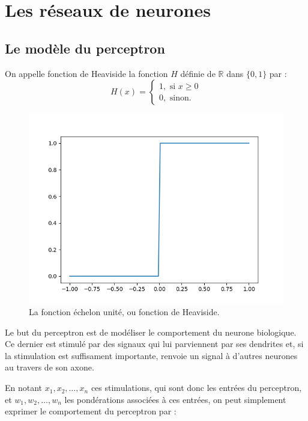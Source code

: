 
\chapter{Les réseaux de neurones}




\section{Le modèle du perceptron}



\begin{definition}
On appelle fonction de Heaviside la fonction $H$ définie de $\mathbb{R}$ dans $\{0, 1\}$ par :
\[
H(x) = 
\begin{cases}
 1, \text{ si } x \geq 0 \\
 0, \text{ sinon.} 
 \end{cases}
\]
\end{definition}

\begin{figure}[h]
  \centering
  \includegraphics[scale=0.5]{assets/heaviside}
  \caption{La fonction échelon unité, ou fonction de Heaviside.}
  \label{fig:heaviside}
\end{figure}

Le but du perceptron est de modéliser le comportement du neurone biologique. 
Ce dernier est stimulé par des signaux qui lui parviennent par ses dendrites et, si 
la stimulation est suffisament importante, renvoie un signal à d'autres neurones au travers de son axone.

En notant $x_1, x_2, \dots, x_n$ ces stimulations, qui sont donc les entrées du perceptron, et 
$w_1, w_2, \dots, w_n$ les pondérations associées à ces entrées, on peut simplement exprimer le 
comportement du perceptron par :


